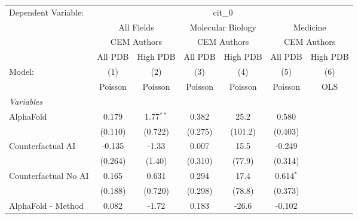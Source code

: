 \begingroup
\centering
\begin{tabular}{lcccccc}
   \tabularnewline \midrule \midrule
   Dependent Variable: & \multicolumn{6}{c}{cit\_0}\\
 & \multicolumn{2}{c}{All Fields} & \multicolumn{2}{c}{Molecular Biology} & \multicolumn{2}{c}{Medicine} \\
\cmidrule(lr){2-3} \cmidrule(lr){4-5} \cmidrule(lr){6-7}
 & \multicolumn{2}{c}{CEM Authors} & \multicolumn{2}{c}{CEM Authors} & \multicolumn{2}{c}{CEM Authors} \\
\cmidrule(lr){2-3} \cmidrule(lr){4-5} \cmidrule(lr){6-7}
 & \multicolumn{1}{c}{All PDB} & \multicolumn{1}{c}{High PDB} & \multicolumn{1}{c}{All PDB} & \multicolumn{1}{c}{High PDB} & \multicolumn{1}{c}{All PDB} & \multicolumn{1}{c}{High PDB} \\
\cmidrule(lr){2-2} \cmidrule(lr){3-3} \cmidrule(lr){4-4} \cmidrule(lr){5-5} \cmidrule(lr){6-6} \cmidrule(lr){7-7}
   Model:                                                     & (1)            & (2)           & (3)           & (4)     & (5)           & (6)\\  
                                                              &  Poisson       & Poisson       & Poisson       & Poisson & Poisson       & OLS\\  
   \midrule
   \emph{Variables}\\
   AlphaFold                                                  & 0.179          & 1.77$^{**}$   & 0.382         & 25.2    & 0.580         &   \\   
                                                              & (0.110)        & (0.722)       & (0.275)       & (101.2) & (0.403)       &   \\   
   Counterfactual AI                                          & -0.135         & -1.33         & 0.007         & 15.5    & -0.249        &   \\   
                                                              & (0.264)        & (1.40)        & (0.310)       & (77.9)  & (0.314)       &   \\   
   Counterfactual No AI                                       & 0.165          & 0.631         & 0.294         & 17.4    & 0.614$^{*}$   &   \\   
                                                              & (0.188)        & (0.720)       & (0.298)       & (78.8)  & (0.373)       &   \\   
   AlphaFold - Method                                         & 0.082          & -1.72         & 0.183         & -26.6   & -0.102        &   \\   

\end{tabular}
